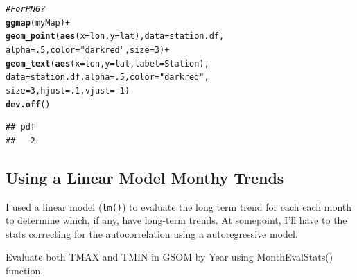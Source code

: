 \documentclass{article}\usepackage[]{graphicx}\usepackage[]{color}
\makeatletter
\newcommand{\hlnum}[1]{\textcolor[rgb]{0.686,0.059,0.569}{#1}}%
\newcommand{\hlstr}[1]{\textcolor[rgb]{0.192,0.494,0.8}{#1}}%
\newcommand{\hlcom}[1]{\textcolor[rgb]{0.678,0.584,0.686}{\textit{#1}}}%
\newcommand{\hlopt}[1]{\textcolor[rgb]{0,0,0}{#1}}%
\newcommand{\hlstd}[1]{\textcolor[rgb]{0.345,0.345,0.345}{#1}}%
\newcommand{\hlkwc}[1]{\textcolor[rgb]{0.333,0.667,0.333}{#1}}%
\newcommand{\hlkwd}[1]{\textcolor[rgb]{0.737,0.353,0.396}{\textbf{#1}}}%
\newenvironment{kframe}{%
 \def\at@end@of@kframe{}%
 \ifinner\ifhmode%
  \def\at@end@of@kframe{\end{minipage}}%
  \begin{minipage}{\columnwidth}%
 \fi\fi%
 \def\FrameCommand##1{\hskip\@totalleftmargin \hskip-\fboxsep
 \colorbox{shadecolor}{##1}\hskip-\fboxsep
     \hskip-\linewidth \hskip-\@totalleftmargin \hskip\columnwidth}%
 \MakeFramed {\advance\hsize-\width
   \@totalleftmargin\z@ \linewidth\hsize
   \@setminipage}}%
 {\par\unskip\endMakeFramed%
 \at@end@of@kframe}
\newenvironment{knitrout}{}{} %
\makeatother
\begin{document}
\begin{knitrout}
\begin{kframe}
\begin{alltt}
\hlcom{# For PNG?}
\hlkwd{ggmap}\hlstd{(myMap)}\hlopt{+}
\hlkwd{geom_point}\hlstd{(}\hlkwd{aes}\hlstd{(}\hlkwc{x} \hlstd{= lon,} \hlkwc{y} \hlstd{= lat),} \hlkwc{data} \hlstd{= station.df,}
   \hlkwc{alpha} \hlstd{=} \hlnum{.5}\hlstd{,} \hlkwc{color}\hlstd{=}\hlstr{"darkred"}\hlstd{,} \hlkwc{size} \hlstd{=} \hlnum{3}\hlstd{)} \hlopt{+}
   \hlkwd{geom_text}\hlstd{(}\hlkwd{aes}\hlstd{(}\hlkwc{x} \hlstd{= lon,} \hlkwc{y} \hlstd{= lat,} \hlkwc{label}\hlstd{=Station),}
      \hlkwc{data} \hlstd{= station.df,} \hlkwc{alpha} \hlstd{=} \hlnum{.5}\hlstd{,} \hlkwc{color}\hlstd{=}\hlstr{"darkred"}\hlstd{,}
      \hlkwc{size} \hlstd{=} \hlnum{3}\hlstd{,} \hlkwc{hjust}\hlstd{=}\hlnum{.1}\hlstd{,} \hlkwc{vjust}\hlstd{=}\hlopt{-}\hlnum{1}\hlstd{)}
\hlkwd{dev.off}\hlstd{()}
\end{alltt}
\begin{verbatim}
## pdf 
##   2
\end{verbatim}
\end{kframe}
\end{knitrout}

\subsection{Using a Linear Model Monthy Trends}

I used a linear model (\texttt{lm()}) to evaluate the long term trend for each each month to determine which, if any, have long-term trends. At somepoint, I'll have to the stats correcting for the autocorrelation using a autoregressive model.  



Evaluate both TMAX and TMIN in GSOM by Year using MonthEvalStats() function. 
\end{document}
